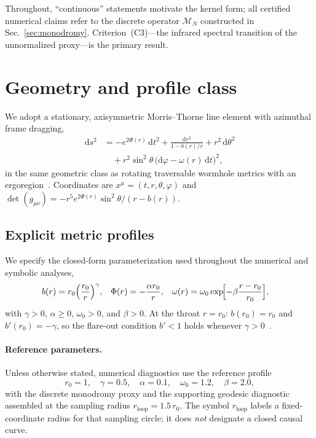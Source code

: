 \documentclass{iopjournal}
\newcommand{\Phir}{\Phi(r)}
\newcommand{\br}{b(r)}
\newcommand{\omegar}{\omega(r)}
\newcommand{\MN}{\mathcal{M}_{N}}
\theoremstyle{remark}
\begin{document}
Throughout, ``continuous'' statements motivate the kernel form; all certified numerical claims refer to the discrete operator $\MN$ constructed in Sec.~\ref{sec:monodromy}.
Criterion~(C3)---the infrared spectral transition of the unnormalized proxy---is the primary result.

\section{Geometry and profile class}
\label{sec:geometry}

We adopt a stationary, axisymmetric Morris--Thorne line element with azimuthal frame dragging,
\begin{equation}
\label{eq:metric}
\begin{split}
\mathrm{d}s^{2}
&= -e^{2\Phir}\,\mathrm{d}t^{2}
 + \frac{\mathrm{d}r^{2}}{1-\br/r}
 + r^{2}\,\mathrm{d}\theta^{2} \\
&\quad + r^{2}\sin^{2}\theta\,\bigl(\mathrm{d}\varphi - \omegar\,\mathrm{d}t\bigr)^{2},
\end{split}
\end{equation}
in the same geometric class as rotating traversable wormhole metrics with an ergoregion~\cite{Morris1988,Visser1995,Teo1998}.
Coordinates are $x^{\mu}=(t,r,\theta,\varphi)$ and
$\det(g_{\mu\nu})=-r^{5}e^{2\Phir}\sin^{2}\theta/(r-\br)$.

\subsection{Explicit metric profiles}

We specify the closed-form parameterization used throughout the numerical and symbolic analyses,
\begin{align}
\label{eq:profiles}
\br &= r_{0}\Bigl(\frac{r_{0}}{r}\Bigr)^{\gamma},
& \Phir &= -\frac{\alpha r_{0}}{r},
& \omegar &= \omega_{0}\exp\!\Bigl[-\beta\frac{r-r_{0}}{r_{0}}\Bigr],
\end{align}
with $\gamma>0$, $\alpha\ge 0$, $\omega_{0}>0$, and $\beta>0$.
At the throat $r=r_{0}$: $b(r_{0})=r_{0}$ and $b'(r_{0})=-\gamma$, so the flare-out condition $b'<1$ holds whenever $\gamma>0$~\cite{Morris1988}.

\paragraph{Reference parameters.}
Unless otherwise stated, numerical diagnostics use the reference profile
\begin{equation}
\label{eq:ref-params}
r_{0}=1,\quad
\gamma=0.5,\quad
\alpha=0.1,\quad
\omega_{0}=1.2,\quad
\beta=2.0,
\end{equation}
with the discrete monodromy proxy and the supporting geodesic diagnostic assembled at the sampling radius $r_{\mathrm{loop}}=1.5\,r_{0}$.
The symbol $r_{\mathrm{loop}}$ labels a fixed-coordinate radius for that sampling circle; it does \emph{not} designate a closed causal curve.
\end{document}
